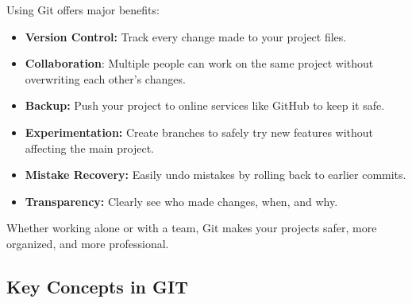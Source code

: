 \documentclass[
  11pt,
  a4paper,
]{article}
\begin{document}
Using Git offers major benefits:

\begin{itemize}
\item
  \textbf{Version Control:} Track every change made to your project
  files.
\item
  \textbf{Collaboration}: Multiple people can work on the same project
  without overwriting each other's changes.
\item
  \textbf{Backup:} Push your project to online services like GitHub to
  keep it safe.
\item
  \textbf{Experimentation:} Create branches to safely try new features
  without affecting the main project.
\item
  \textbf{Mistake Recovery:} Easily undo mistakes by rolling back to
  earlier commits.
\item
  \textbf{Transparency:} Clearly see who made changes, when, and why.
\end{itemize}

Whether working alone or with a team, Git makes your projects safer,
more organized, and more professional.

\newpage

\subsection{Key Concepts in GIT}\label{key-concepts-in-git}
\end{document}
